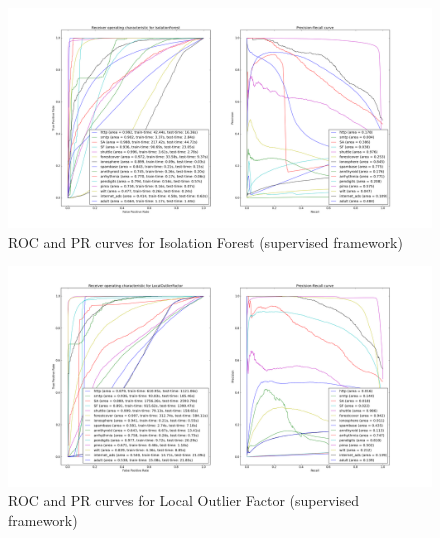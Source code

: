 \begin{figure}[!ht]
  \centering
  \includegraphics[width=1.1\linewidth]{fig_source/bench_iforest_roc_pr.png}
  \caption{ROC and PR curves for Isolation Forest (supervised framework)}
  \label{back:fig:iforest_roc_pr}
\end{figure}


\begin{figure}[!ht]
  \centering
  \includegraphics[width=\linewidth]{fig_source/bench_lof_roc_pr.png}
  \caption{ROC and PR curves for Local Outlier Factor (supervised framework)}
  \label{back:fig:lof_roc_pr}
\end{figure}

